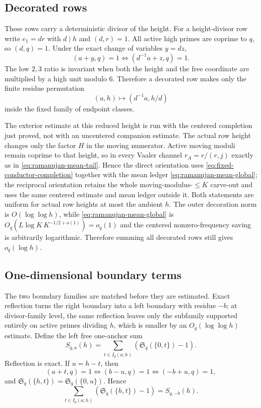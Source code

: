 \documentclass[11pt]{article}
\theoremstyle{definition}
\theoremstyle{remark}
\newcommand{\SSer}{\mathfrak S}
\newcommand{\1}{\mathbf 1}
\begin{document}
\subsection{Decorated rows}

These rows carry a deterministic divisor of the height.  For a height-divisor
row write $e_1=dr$ with $d\mid h$ and $(d,r)=1$.  All active high primes are
coprime to $q$, so $(d,q)=1$.  Under the exact change of variables $y=dz$,
\begin{equation}\label{eq:decorated-residue}
(a+y,q)=1
\Longleftrightarrow
(d^{-1}a+z,q)=1.
\end{equation}
The low $2,3$ ratio is invariant when both the height and the free coordinate
are multiplied by a high unit modulo $6$.  Therefore a decorated row makes only
the finite residue permutation
\begin{equation}\label{eq:decorated-map}
(a,h)\longmapsto(d^{-1}a,h/d)
\end{equation}
inside the fixed family of endpoint classes.

The exterior estimate at this reduced height is run with the centered
completion just proved, not with an uncentered companion estimate.  The actual
row height changes only the factor $H$ in the moving numerator.  Active moving
moduli remain coprime to that height, so in every Vaaler channel
$r_A=r/(r,j)$ exactly as in \eqref{eq:ramanujan-mean-tail}.  Hence the direct
orientation uses \eqref{eq:fixed-conductor-completion} together with the mean
ledger \eqref{eq:ramanujan-mean-global}; the reciprocal orientation retains the
whole moving-modulus-$\le K$ carve-out and uses the same centered estimate and
mean ledger outside it.  Both statements are uniform for actual row heights at
most the ambient $h$.  The outer decoration norm is $O(\log\log h)$, while
\eqref{eq:ramanujan-mean-global} is $O_q(L\log K\,K^{-1/2+o(1)})=o_q(1)$ and
the centered nonzero-frequency saving is arbitrarily logarithmic.  Therefore
summing all decorated rows still gives $o_q(\log h)$.

\subsection{One-dimensional boundary terms}

The two boundary families are matched before they are estimated.  Exact reflection turns the right boundary into a left boundary with residue $-b$; at divisor-family level, the same reflection leaves only the subfamily supported entirely on active primes dividing $h$, which is smaller by an $O_q(\log\log h)$ estimate.  Define the left free one-anchor sum
\begin{equation}\label{eq:Sqa}
S_{q,a}(h)=\sum_{t\in I_q(a;h)}(\SSer_q(\{0,t\})-1).
\end{equation}
Reflection is exact.  If $u=h-t$, then
\[
(a+t,q)=1
\Longleftrightarrow
(b-u,q)=1
\Longleftrightarrow
(-b+u,q)=1,
\]
and $\SSer_q(\{h,t\})=\SSer_q(\{0,u\})$.  Hence
\begin{equation}\label{eq:reflection-q}
\boxed{
\sum_{t\in I_q(a;h)}(\SSer_q(\{h,t\})-1)
=S_{q,-b}(h).
}
\end{equation}
\end{document}
